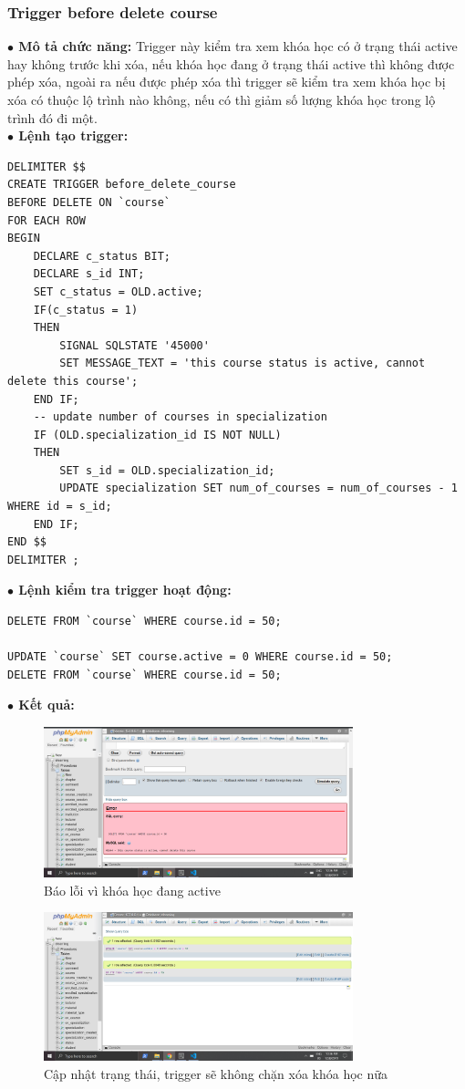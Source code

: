 \documentclass[12pt,a4paper,titlepage]{article}
\begin{document}
\subsubsection{Trigger before delete course}
\textbf{$\bullet$ Mô tả chức năng:} Trigger này kiểm tra xem khóa học có ở trạng thái active hay không trước khi xóa, nếu khóa học đang ở trạng thái active thì không được phép xóa, ngoài ra nếu được phép xóa thì trigger sẽ kiểm tra xem khóa học bị xóa có thuộc lộ trình nào không, nếu có thì giảm số lượng khóa học trong lộ trình đó đi một.\\
\textbf{$\bullet$ Lệnh tạo trigger:}
\begin{lstlisting}
DELIMITER $$
CREATE TRIGGER before_delete_course
BEFORE DELETE ON `course`
FOR EACH ROW
BEGIN
    DECLARE c_status BIT;
    DECLARE s_id INT;
    SET c_status = OLD.active;
    IF(c_status = 1)
   	THEN
        SIGNAL SQLSTATE '45000'
		SET MESSAGE_TEXT = 'this course status is active, cannot delete this course';
    END IF;
    -- update number of courses in specialization
    IF (OLD.specialization_id IS NOT NULL)
	THEN
        SET s_id = OLD.specialization_id;
		UPDATE specialization SET num_of_courses = num_of_courses - 1 WHERE id = s_id;
	END IF;
END $$
DELIMITER ;
\end{lstlisting}
\newpage
\textbf{$\bullet$ Lệnh kiểm tra trigger hoạt động:}
\begin{lstlisting}
DELETE FROM `course` WHERE course.id = 50;

UPDATE `course` SET course.active = 0 WHERE course.id = 50;
DELETE FROM `course` WHERE course.id = 50;
\end{lstlisting}
\textbf{$\bullet$ Kết quả:}
\begin{figure}[h!]
	\centering
	\caption{Báo lỗi vì khóa học đang active}
	\includegraphics[width=0.8\textwidth]{images/triggerc2.png}
\end{figure}
\begin{figure}[h!]
	\centering
	\caption{Cập nhật trạng thái, trigger sẽ không chặn xóa khóa học nữa}
	\includegraphics[width=0.8\textwidth]{images/triggerc3.png}
\end{figure}
\end{document}
